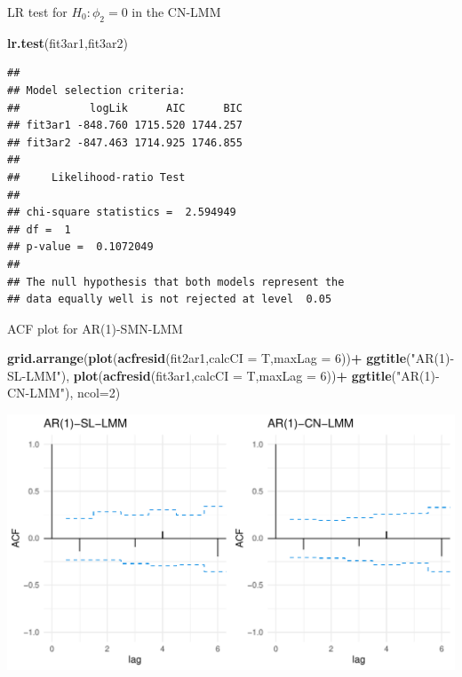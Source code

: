 \documentclass[
  ignorenonframetext,
]{beamer}
\newenvironment{Shaded}{\begin{snugshade}}{\end{snugshade}}
\newcommand{\DataTypeTok}[1]{\textcolor[rgb]{0.13,0.29,0.53}{#1}}
\newcommand{\DecValTok}[1]{\textcolor[rgb]{0.00,0.00,0.81}{#1}}
\newcommand{\KeywordTok}[1]{\textcolor[rgb]{0.13,0.29,0.53}{\textbf{#1}}}
\newcommand{\NormalTok}[1]{#1}
\newcommand{\OperatorTok}[1]{\textcolor[rgb]{0.81,0.36,0.00}{\textbf{#1}}}
\newcommand{\StringTok}[1]{\textcolor[rgb]{0.31,0.60,0.02}{#1}}
\begin{document}
\begin{frame}[fragile]{LR test for \(H_0: \phi_2=0\) in the CN-LMM}
\protect\hypertarget{lr-test-for-h_0-phi_20-in-the-cn-lmm}{}

\small

\begin{Shaded}
\begin{Highlighting}[]
\KeywordTok{lr.test}\NormalTok{(fit3ar1,fit3ar2)}
\end{Highlighting}
\end{Shaded}

\begin{verbatim}
## 
## Model selection criteria:
##           logLik      AIC      BIC
## fit3ar1 -848.760 1715.520 1744.257
## fit3ar2 -847.463 1714.925 1746.855
## 
##     Likelihood-ratio Test
## 
## chi-square statistics =  2.594949 
## df =  1 
## p-value =  0.1072049 
## 
## The null hypothesis that both models represent the 
## data equally well is not rejected at level  0.05
\end{verbatim}

\end{frame}

\begin{frame}[fragile]{ACF plot for AR(1)-SMN-LMM}
\protect\hypertarget{acf-plot-for-ar1-smn-lmm}{}

\scriptsize

\begin{Shaded}
\begin{Highlighting}[]
\KeywordTok{grid.arrange}\NormalTok{(}\KeywordTok{plot}\NormalTok{(}\KeywordTok{acfresid}\NormalTok{(fit2ar1,}\DataTypeTok{calcCI =}\NormalTok{ T,}\DataTypeTok{maxLag =} \DecValTok{6}\NormalTok{))}\OperatorTok{+}
\StringTok{               }\KeywordTok{ggtitle}\NormalTok{(}\StringTok{"AR(1)-SL-LMM"}\NormalTok{),}
             \KeywordTok{plot}\NormalTok{(}\KeywordTok{acfresid}\NormalTok{(fit3ar1,}\DataTypeTok{calcCI =}\NormalTok{ T,}\DataTypeTok{maxLag =} \DecValTok{6}\NormalTok{))}\OperatorTok{+}
\StringTok{               }\KeywordTok{ggtitle}\NormalTok{(}\StringTok{"AR(1)-CN-LMM"}\NormalTok{), }\DataTypeTok{ncol=}\DecValTok{2}\NormalTok{)}
\end{Highlighting}
\end{Shaded}

\begin{center}\includegraphics[width=0.85\linewidth]{codes_files/figure-beamer/acf1-1} \end{center}

\end{frame}
\end{document}
